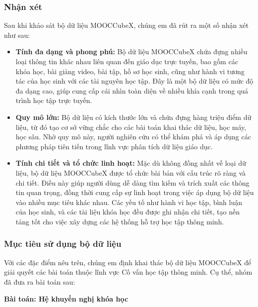 \subsubsection{Nhận xét}

Sau khi khảo sát bộ dữ liệu MOOCCubeX, chúng em đã rút ra một số nhận xét như sau:

\begin{itemize}
    \item \textbf{Tính đa dạng và phong phú:} Bộ dữ liệu MOOCCubeX chứa đựng nhiều loại thông tin khác nhau liên quan đến giáo dục trực tuyến, bao gồm các khóa học, bài giảng video, bài tập, hồ sơ học sinh, cũng như hành vi tương tác của học sinh với các tài nguyên học tập. Đây là một bộ dữ liệu có mức độ đa dạng cao, giúp cung cấp cái nhìn toàn diện về nhiều khía cạnh trong quá trình học tập trực tuyến.
    
    \item \textbf{Quy mô lớn:} Bộ dữ liệu có kích thước lớn và chứa đựng hàng triệu điểm dữ liệu, từ đó tạo cơ sở vững chắc cho các bài toán khai thác dữ liệu, học máy, học sâu. Nhờ quy mô này, người nghiên cứu có thể khám phá và áp dụng các phương pháp tiên tiến trong lĩnh vực phân tích dữ liệu giáo dục.
    
    \item \textbf{Tính chi tiết và tổ chức linh hoạt:} Mặc dù không đồng nhất về loại dữ liệu, bộ dữ liệu MOOCCubeX được tổ chức bài bản với cấu trúc rõ ràng và chi tiết. Điều này giúp người dùng dễ dàng tìm kiếm và trích xuất các thông tin quan trọng, đồng thời cung cấp sự linh hoạt trong việc áp dụng bộ dữ liệu vào nhiều mục tiêu khác nhau. Các yếu tố như hành vi học tập, bình luận của học sinh, và các tài liệu khóa học đều được ghi nhận chi tiết, tạo nền tảng tốt cho việc xây dựng các hệ thống hỗ trợ học tập thông minh.
\end{itemize}

\subsubsection{Mục tiêu sử dụng bộ dữ liệu}

Với các đặc điểm nêu trên, chúng em định khai thác bộ dữ liệu MOOCCubeX để giải quyết các bài toán thuộc lĩnh vực Cố vấn học tập thông minh. Cụ thể, nhóm đã đưa ra bài toán sau:

\textbf{Bài toán: Hệ khuyến nghị khóa học}

